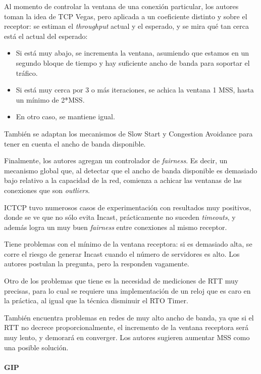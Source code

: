 \documentclass[runningheads,a4paper]{llncs}
\begin{document}
Al momento de controlar la ventana de una conexión particular, los autores toman la idea de TCP Vegas, pero aplicada a un coeficiente distinto y sobre el receptor: se estiman el \textit{throughput} actual y el esperado, y se mira qué tan cerca está el actual del esperado:

\begin{itemize}
    \item Si está muy abajo, se incrementa la ventana, asumiendo que estamos en un segundo bloque de tiempo y hay suficiente ancho de banda para soportar el tráfico.
    
    \item Si está muy cerca por 3 o más iteraciones, se achica la ventana 1 MSS, hasta un mínimo de 2*MSS.
    
    \item En otro caso, se mantiene igual.
\end{itemize}

También se adaptan los mecanismos de Slow Start y Congestion Avoidance para tener en cuenta el ancho de banda disponible.

Finalmente, los autores agregan un controlador de \textit{fairness}. Es decir, un mecanismo global que, al detectar que el ancho de banda disponible es demasiado bajo relativo a la capacidad de la red, comienza a achicar las ventanas de las conexiones que son \textit{outliers}.

ICTCP tuvo numerosos casos de experimentación con resultados muy positivos, donde se ve que no sólo evita Incast, prácticamente no suceden \textit{timeouts}, y además logra un muy buen \textit{fairness} entre conexiones al mismo receptor. 

Tiene problemas con el mínimo de la ventana receptora: si es demasiado alta, se corre el riesgo de generar Incast cuando el número de servidores es alto. Los autores postulan la pregunta, pero la responden vagamente.

Otro de los problemas que tiene es la necesidad de mediciones de RTT muy precisas, para lo cual se requiere una implementación de un reloj que es caro en la práctica, al igual que la técnica disminuir el RTO Timer. 

También encuentra problemas en redes de muy alto ancho de banda, ya que si el RTT no decrece proporcionalmente, el incremento de la ventana receptora será muy lento, y demorará en converger. Los autores sugieren aumentar MSS como una posible solución.

\paragraph{GIP}
\end{document}
